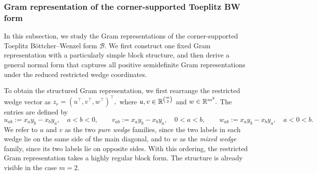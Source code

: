 \subsubsection{Gram representation of the corner-supported Toeplitz BW form}
\label{subsec:corner-gram}

In this subsection, we study the Gram representations of the
corner-supported Toeplitz B\"ottcher--Wenzel form $\mathcal B$.  We
first construct one fixed Gram representation with a particularly simple
block structure, and then derive a general normal form that captures all
positive semidefinite Gram representations under the reduced restricted
wedge coordinates.

To obtain the structured Gram representation, we first rearrange the
restricted wedge vector as
$
z_r=(u^\top,v^\top,w^\top)^\top,
$
where
$
u,v\in\mathbb{R}^{\binom m2}
$
and
$
w\in\mathbb{R}^{m^2}.
$
The entries are defined by
\[
u_{ab}:=x_ay_b-x_by_a,\quad a<b<0,\qquad
v_{ab}:=x_ay_b-x_by_a,\quad 0<a<b, \qquad
w_{ab}:=x_ay_b-x_by_a,\quad a<0<b.
\]
We refer to $u$ and $v$ as the two \emph{pure wedge} families, since the
two labels in each wedge lie on the same side of the main diagonal, and
to $w$ as the \emph{mixed wedge} family, since its two labels lie on
opposite sides. With this ordering, the restricted Gram representation takes a highly
regular block form.  The structure is already visible in the case
$m=2$.



